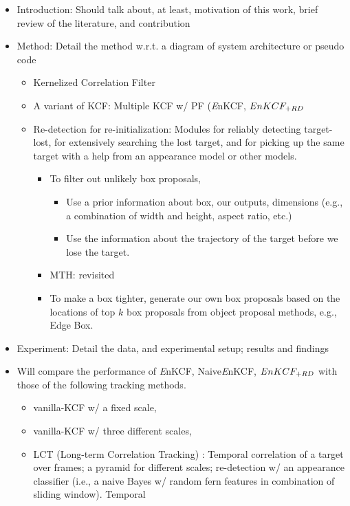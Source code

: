 \documentclass[10pt,twocolumn,letterpaper]{article}
\newcounter{ct}
\begin{document}
\begin{itemize}
\item Introduction: Should talk about, at least, motivation of this
  work, brief review of the literature, and contribution
\item Method: Detail the method w.r.t. a diagram of system
  architecture or pseudo code
\begin{itemize}
\item Kernelized Correlation Filter
\item A variant of KCF: Multiple KCF w/ PF ({\it E}nKCF, ${\it E}nKCF_{+RD}$
\item Re-detection for re-initialization: Modules for reliably
  detecting target-lost, for extensively searching the lost target,
  and for picking up the same target with a help from an appearance
  model or other models.
\begin{itemize}
\item To filter out unlikely box proposals,
\begin{itemize}
\item Use a prior information about box, our outputs, dimensions
  (e.g., a combination of width and height, aspect ratio, etc.)
\item Use the information about the trajectory of the target before we
  lose the target.
\end{itemize}
\item MTH: revisited
\item To make a box tighter, generate our own box proposals based on
  the locations of top $k$ box proposals from object proposal methods,
  e.g., Edge Box.
\end{itemize}
\end{itemize}
\item Experiment: Detail the data, and experimental setup; results and findings
\item Will compare the performance of {\it E}nKCF, Naive{\it E}nKCF,
  ${\it E}nKCF_{+RD}$ with those of the following tracking methods.
\begin{itemize}
\item vanilla-KCF w/ a fixed scale,
\item vanilla-KCF w/ three different scales,
\item LCT (Long-term Correlation Tracking) \cite{ma2015long}: Temporal
  correlation of a target over frames; a pyramid for different scales;
  re-detection w/ an appearance classifier (i.e., a naive Bayes w/
  random fern features in combination of sliding window). Temporal

\end{itemize}
\end{itemize}
\end{document}
